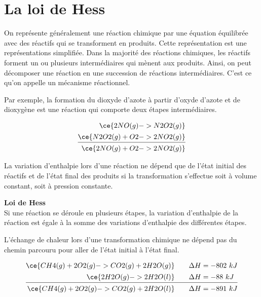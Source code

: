 \documentclass[
  11pt,
  a4paper,
  openany]{book}
\begin{document}
\section{La loi de Hess}\label{la-loi-de-hess}

On représente généralement une réaction chimique par une équation équilibrée avec des réactifs qui se transforment en produits. Cette représentation est une représentations simplifiée. Dans la majorité des réactions chimiques, les réactifs forment un ou plusieurs intermédiaires qui mènent aux produits. Ainsi, on peut décomposer une réaction en une succession de réactions intermédiaires. C'est ce qu'on appelle un mécanisme réactionnel.

Par exemple, la formation du dioxyde d'azote à partir d'oxyde d'azote et de dioxygène est une réaction qui comporte deux étapes intermédiaires.

\[
\begin{split}
\ce{2 NO(g) -> N2O2(g)} \\[0.1em]
\ce{N2O2(g) + O2 -> 2NO2(g)} \\[0.1em]
\hline\\[-1.2em]
\ce{2 NO(g) + O2 -> 2NO2(g)}
\end{split}
\]

La variation d'enthalpie lors d'une réaction ne dépend que de l'état initial des réactifs et de l'état final des produits si la transformation s'effectue soit à volume constant, soit à pression constante.

\begin{tcolorbox}
\textbf{Loi de Hess}\\
Si une réaction se déroule en plusieurs étapes, la variation d'enthalpie de la réaction est égale à la somme des variations d'enthalpie des différentes étapes.

\end{tcolorbox}

L'échange de chaleur lors d'une transformation chimique ne dépend pas du chemin parcouru pour aller de l'état initial à l'état final.

\[
\begin{split}
\ce{CH4(g) + 2 O2(g) -> CO2(g) + 2 H2O(g)} \qquad \Delta H &= -802\ kJ \\[0.1em]
\ce{2 H2O(g) -> 2 H2O(l)} \qquad \Delta H &= -88\ kJ \\[0.1em]
\hline\\[-1.2em]
\ce{CH4(g) + 2 O2(g) -> CO2(g) + 2 H2O(l)} \qquad \Delta H &= -891\ kJ
\end{split}
\]
\end{document}
